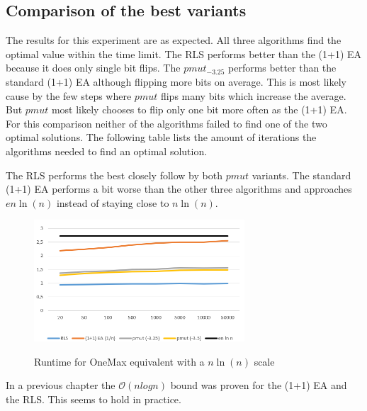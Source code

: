 \subsection{Comparison of the best variants}




The results for this experiment are as expected.
All three algorithms find the optimal value within the time limit.
The RLS performs better than the (1+1) EA because it does only single bit flips.
The $pmut_{-3.25}$ performs better than the standard (1+1) EA although flipping more bits on average.
This is most likely cause by the few steps where $pmut$ flips many bits which increase the average.
But $pmut$ most likely chooses to flip only one bit more often as the (1+1) EA.\newline
For this comparison neither of the algorithms failed to find one of the two optimal solutions.
The following table lists the amount of iterations the algorithms needed to find an optimal solution.



The RLS performs the best closely follow by both $pmut$ variants.
The standard (1+1) EA performs a bit worse than the other three algorithms and approaches $en\ln(n)$ instead of staying close to $n\ln(n)$.

\begin{figure}[h]
      \caption{Runtime for OneMax equivalent with a $n\ln(n)$ scale}
      \centering
      \includegraphics[width=0.7\textwidth]{figures/images/oneMaxMultipleN.png}\label{fig:onemaxNlogNBound}
\end{figure}

In a previous chapter the $\mathcal{O}(nlogn)$ bound was proven for the (1+1) EA and the RLS.
This seems to hold in practice.
